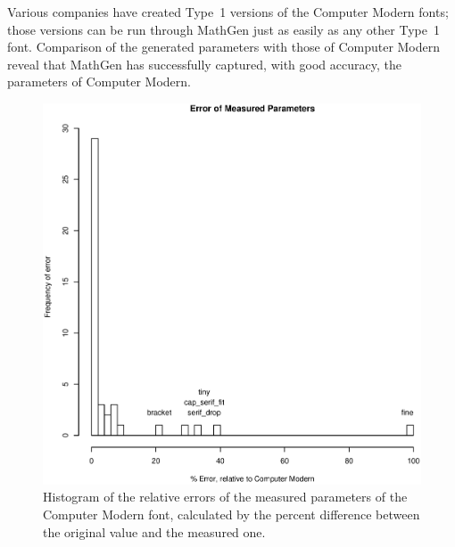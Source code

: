 
Various companies have created Type~1 versions of the Computer Modern fonts;
those versions can be run through MathGen just as easily as any other Type~1
font. Comparison of the generated parameters with those of Computer Modern
reveal that MathGen has successfully captured, with good accuracy, the
parameters of Computer Modern.

\begin{figure}
\begin{center}
\includegraphics[width=6in]{params/cmr}
\end{center}
\caption{Histogram of the relative errors of the measured parameters of the
Computer Modern font, calculated by the percent difference between the original
value and the measured one.}
\label{f:cmr}
\end{figure}

